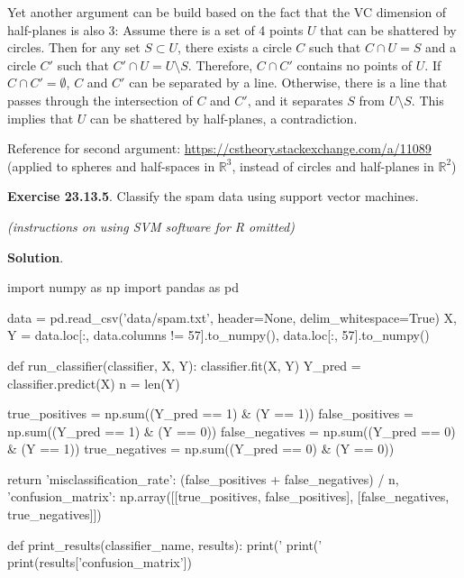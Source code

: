 Yet another argument can be build based on the fact that the VC
dimension of half-planes is also 3: Assume there is a set of 4 points
\(U\) that can be shattered by circles. Then for any set
\(S \subset U\), there exists a circle \(C\) such that \(C \cap U = S\)
and a circle \(C'\) such that \(C' \cap U = U \setminus S\). Therefore,
\(C \cap C'\) contains no points of \(U\). If \(C \cap C' = \emptyset\),
\(C\) and \(C'\) can be separated by a line. Otherwise, there is a line
that passes through the intersection of \(C\) and \(C'\), and it
separates \(S\) from \(U \setminus S\). This implies that \(U\) can be
shattered by half-planes, a contradiction.

Reference for second argument:
\url{https://cstheory.stackexchange.com/a/11089} (applied to spheres and
half-spaces in \(\mathbb{R}^{3}\), instead of circles and half-planes in
\(\mathbb{R}^{2}\))

\textbf{Exercise 23.13.5}. Classify the spam data using support vector
machines.

\emph{(instructions on using SVM software for R omitted)}

\textbf{Solution}.

\begin{python}
import numpy as np
import pandas as pd

data = pd.read_csv('data/spam.txt', header=None, delim_whitespace=True)
X, Y = data.loc[:, data.columns != 57].to_{n}umpy(), data.loc[:, 57].to_{n}umpy()
\end{python}

\begin{python}
def run_classifier(classifier, X, Y):
    classifier.fit(X, Y)
    Y_pred = classifier.predict(X)
    n = len(Y)
    
    true_positives = np.sum((Y_pred == 1) & (Y == 1))
    false_positives = np.sum((Y_pred == 1) & (Y == 0))
    false_{n}egatives = np.sum((Y_pred == 0) & (Y == 1))
    true_{n}egatives = np.sum((Y_pred == 0) & (Y == 0))

    return {
        'misclassification_rate': (false_positives + false_{n}egatives) / n,
        'confusion_matrix': np.array([[true_positives, false_positives], [false_{n}egatives, true_{n}egatives]])
    }

def print_results(classifier_{n}ame, results):
    print('%
    print('%
    print(results['confusion_matrix'])
\end{python}

